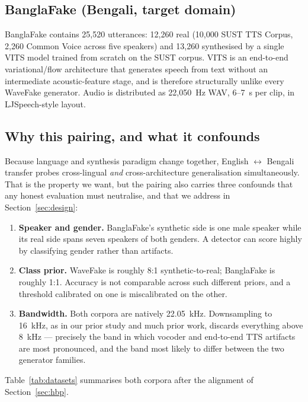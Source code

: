 \documentclass[conference]{IEEEtran}
\renewcommand{\cite}[1]{\unskip}
\begin{document}
\subsection{BanglaFake (Bengali, target domain)}
BanglaFake \cite{fahad2025banglafake} contains 25,520 utterances: 12,260
real (10,000 SUST TTS Corpus, 2,260 Common Voice across five speakers) and
13,260 synthesised by a single VITS model trained from scratch on the SUST
corpus. VITS is an end-to-end variational/flow architecture that generates
speech from text without an intermediate acoustic-feature stage, and is
therefore structurally unlike every WaveFake generator. Audio is
distributed as 22{,}050~Hz WAV, 6--7~s per clip, in LJSpeech-style layout.

\subsection{Why this pairing, and what it confounds}
\label{sec:pairing}
Because language and synthesis paradigm change together, English
$\leftrightarrow$ Bengali transfer probes cross-lingual \emph{and}
cross-architecture generalisation simultaneously. That is the property we
want, but the pairing also carries three confounds that any honest
evaluation must neutralise, and that we address in
Section~\ref{sec:design}:

\begin{enumerate}
\item \textbf{Speaker and gender.} BanglaFake's synthetic side is one male
speaker while its real side spans seven speakers of both genders. A
detector can score highly by classifying gender rather than artifacts.
\item \textbf{Class prior.} WaveFake is roughly 8:1 synthetic-to-real;
BanglaFake is roughly 1:1. Accuracy is not comparable across such
different priors, and a threshold calibrated on one is miscalibrated on the
other.
\item \textbf{Bandwidth.} Both corpora are natively 22.05~kHz. Downsampling
to 16~kHz, as in our prior study and much prior work, discards
everything above 8~kHz --- precisely the band in which vocoder and
end-to-end TTS artifacts are most pronounced, and the band most likely to
differ between the two generator families.
\end{enumerate}

Table~\ref{tab:datasets} summarises both corpora after the alignment of
Section~\ref{sec:hbp}.
\end{document}
